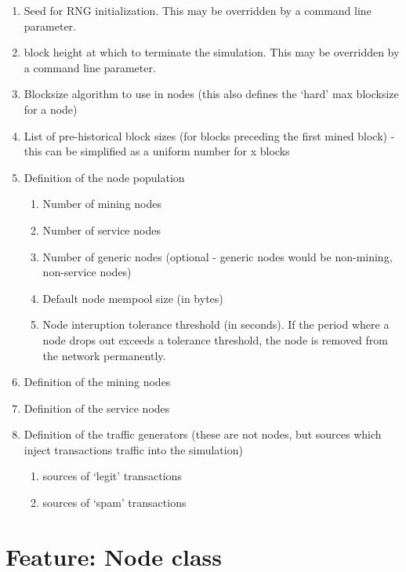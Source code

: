 \documentclass{scrreprt}
\begin{document}
        \begin{enumerate}
          \item Seed for RNG initialization.
            This may be overridden by a command line parameter.
          \item block height at which to terminate the simulation.
            This may be overridden by a command line parameter.
          \item Blocksize algorithm to use in nodes (this also defines the
            `hard' max blocksize for a node)
          \item List of pre-historical block sizes (for blocks preceding the
            first mined block) - this can be simplified as a uniform number for x
            blocks
          \item Definition of the node population
            \begin{enumerate}
              \item Number of mining nodes
              \item Number of service nodes
              \item Number of generic nodes (optional - generic nodes would be
                non-mining, non-service nodes)
              \item Default node mempool size (in bytes)
              \item Node interuption tolerance threshold (in seconds).
                If the period where a node drops out exceeds a tolerance threshold,
                the node is removed from the network permanently.
            \end{enumerate}
          \item Definition of the mining nodes
          \item Definition of the service nodes
          \item Definition of the traffic generators (these are not nodes, but
            sources which inject transactions traffic into the simulation)
            \begin{enumerate}
              \item sources of `legit' transactions
              \item sources of `spam' transactions
            \end{enumerate}
        \end{enumerate}

  \section{Feature: Node class}
\end{document}

